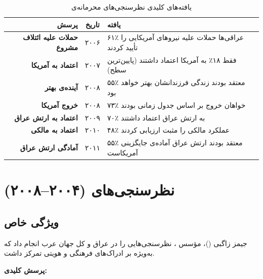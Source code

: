 \begin{table}[H]
\centering
\caption{یافته‌های کلیدی نظرسنجی‌های محرمانه‌ی }
\label{tab:d3-findings}
\small
\begin{tabularx}{\textwidth}{>{\bfseries\small}r >{\small}c >{\small}X}
\toprule
\textbf{پرسش} & \textbf{تاریخ} & \textbf{یافته} \\
\midrule
حملات علیه ائتلاف مشروع & ۲۰۰۶ & ۶۱٪ عراقی‌ها حملات علیه نیروهای آمریکایی را تأیید کردند \\
\addlinespace
اعتماد به آمریکا & ۲۰۰۷ & فقط ۱۸٪ به آمریکا اعتماد داشتند (پایین‌ترین سطح) \\
\addlinespace
آینده‌ی بهتر & ۲۰۰۸ & ۵۵٪ معتقد بودند زندگی فرزندانشان بهتر خواهد بود \\
\addlinespace
خروج آمریکا & ۲۰۰۸ & ۷۳٪ خواهان خروج بر اساس جدول زمانی بودند \\
\addlinespace
اعتماد به ارتش عراق & ۲۰۰۹ & ۷۰٪ به ارتش عراق اعتماد داشتند \\
\addlinespace
اعتماد به مالکی & ۲۰۱۰ & ۴۸٪ عملکرد مالکی را مثبت ارزیابی کردند \\
\addlinespace
آمادگی ارتش عراق & ۲۰۱۱ & ۵۵٪ معتقد بودند ارتش عراق آماده‌ی جایگزینی آمریکاست \\
\bottomrule
\end{tabularx}
\end{table}


\section{نظرسنجی‌های  (۲۰۰۴--۲۰۰۸)}

\subsection{ویژگی خاص}
جیمز زاگبی ()، مؤسس ، 
نظرسنجی‌هایی را در عراق و کل جهان عرب انجام داد که به‌ویژه بر 
ادراک‌های فرهنگی و هویتی تمرکز داشت.

\textbf{پرسش کلیدی:}
\begin{quote}
\end{quote}

